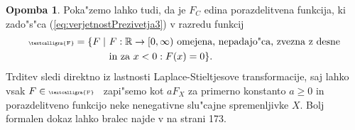 \documentclass[12pt, a4paper, reqno]{amsart}
\theoremstyle{definition}
\newtheorem{opomba}[definicija]{Opomba}
\theoremstyle{plain}
\newcommand{\R}{\mathbb{R}}
\newcommand{\1}{\mathds{1}}
\begin{document}
        \begin{opomba}
            Poka"zemo lahko tudi, da je $F_C$ edina porazdelitvena funkcija, ki zado"s"ca (\ref{eq:verjetnostPrezivetja3})
            v razredu funkcij 
            \begin{align*}
                \text{\tiny\textcalligra{F}} = \{F \mid \ & \text{$F:\R\to[0, \infty)$ omejena, nepadajo"ca, zvezna z desne} \\
                & \text{in za $x<0:F(x)=0$}\}.
            \end{align*}
            Trditev sledi direktno iz lastnosti Laplace-Stieltjesove transformacije, saj lahko vsak $F\in
            \text{\tiny\textcalligra{F}}$ \ zapi"semo kot $aF_X$ za primerno konstanto $a\geq0$ in porazdelitveno 
            funkcijo neke nenegativne slu"cajne spremenljivke $X$. Bolj formalen dokaz lahko bralec najde 
            v \cite{4} na strani 173.
            \label{op:tezkorepnePorazdelitveAsimptotika}
        \end{opomba}
\end{document}

